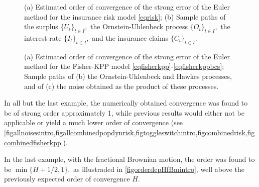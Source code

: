\documentclass[reqno,12pt]{amsart}
\theoremstyle{plain} %
\theoremstyle{definition} %
\begin{document}
\begin{figure}[htb]
    \caption{(a) Estimated order of convergence of the strong error of the Euler method for the insurance risk model \cref{eqrisk}; (b) Sample paths of the surplus $\{U_t\}_{t\in I},$ the Ornstein-Uhlenbeck process $\{O_t\}_{t\in I},$ the interest rate {$\{I_t\}_{t\in I},$} and the insurance claims $\{C_t\}_{t\in I}.$}
    \label{figcombinedrisk}
\end{figure}

\begin{figure}[htb]
    \caption{(a) Estimated order of convergence of the strong error of the Euler method for the Fisher-KPP model \cref{eqfisherkpp}-\cref{eqfisherkppbcs}; Sample paths of (b) the Ornstein-Uhlenbeck and Hawkes processes, and of (c) the noise obtained as the product of these processes.}
    \label{figcombinedfisherkpp}
\end{figure}

In all but the last example, the numerically obtained convergence was found to be of strong order approximately 1, while previous results would either not be applicable or yield a much lower order of convergence (see \cref{figallnoisesintro,figallcombinedpopdynrisk,figtoggleswitchintro,figcombinedrisk,figcombinedfisherkpp}).

In the last example, with the fractional Brownian motion, the order was found to be $\min\{H+1/2, 1\},$ as illustraded in \cref{figorderdepHfBmintro}, well above the previously expected order of convergence $H.$
\end{document}
